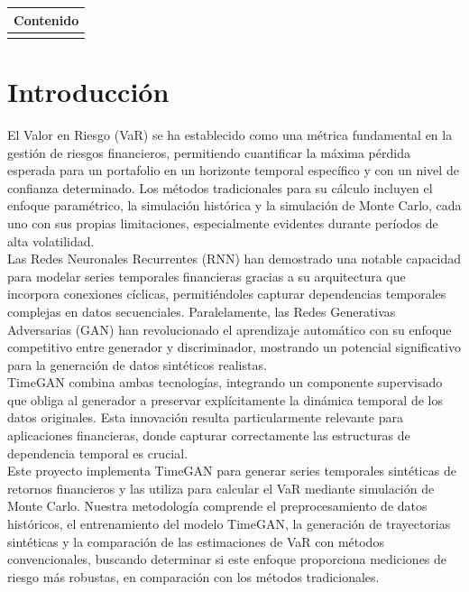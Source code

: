 \documentclass{article}
\theoremstyle{definition}
\theoremstyle{remark}
\newenvironment{cuadrocontenido}{
  \begin{center}
  \begin{tabular}{|p{0.97\textwidth}|}
    \hline
    \multicolumn{1}{|c|}{
        \rule{0pt}{2.5ex}
        \textbf{\large Contenido}
        \rule{0pt}{2.5ex}
    } \\
    \hline
    \begin{minipage}{0.96\textwidth}
        \centering
        \vspace{0.5em}
}{%
        \vspace{0.5em}
    \end{minipage} \\
    \hline
  \end{tabular}
  \end{center}
}
\begin{document}
\thispagestyle{firstpage}
\vspace*{10\baselineskip} %

\renewcommand{\contentsname}{}
\begin{cuadrocontenido}
  \tableofcontents
\end{cuadrocontenido}

\section{Introducción}
El Valor en Riesgo (VaR) se ha establecido como una métrica fundamental en la gestión de riesgos financieros, permitiendo cuantificar la máxima pérdida esperada para un portafolio en un horizonte temporal específico y con un nivel de confianza determinado. Los métodos tradicionales para su cálculo incluyen el enfoque paramétrico, la simulación histórica y la simulación de Monte Carlo, cada uno con sus propias limitaciones, especialmente evidentes durante períodos de alta volatilidad.\\

Las Redes Neuronales Recurrentes (RNN) han demostrado una notable capacidad para modelar series temporales financieras gracias a su arquitectura que incorpora conexiones cíclicas, permitiéndoles capturar dependencias temporales complejas en datos secuenciales. Paralelamente, las Redes Generativas Adversarias (GAN) han revolucionado el aprendizaje automático con su enfoque competitivo entre generador y discriminador, mostrando un potencial significativo para la generación de datos sintéticos realistas.\\

TimeGAN combina ambas tecnologías, integrando un componente supervisado que obliga al generador a preservar explícitamente la dinámica temporal de los datos originales. Esta innovación resulta particularmente relevante para aplicaciones financieras, donde capturar correctamente las estructuras de dependencia temporal es crucial.\\

Este proyecto implementa TimeGAN para generar series temporales sintéticas de retornos financieros y las utiliza para calcular el VaR mediante simulación de Monte Carlo. Nuestra metodología comprende el preprocesamiento de datos históricos, el entrenamiento del modelo TimeGAN, la generación de trayectorias sintéticas y la comparación de las estimaciones de VaR con métodos convencionales, buscando determinar si este enfoque proporciona mediciones de riesgo más robustas, en comparación con los métodos tradicionales.
\end{document}
